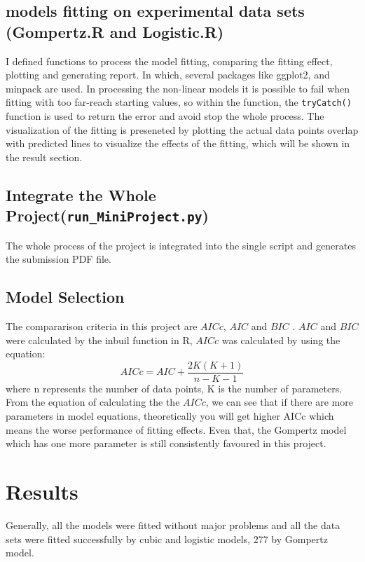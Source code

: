 \documentclass[11pt, a4paper]{article}
\begin{document}
\subsection{models fitting on experimental data sets (Gompertz.R and Logistic.R)}

I defined functions to process the model fitting, comparing the fitting effect, plotting and generating report. In which, several packages like ggplot2, and minpack are used. In processing the non-linear models it is possible to fail when fitting with too far-reach starting values, so within the function, the \verb|tryCatch()| function is used to return the error and avoid stop the whole process. The visualization of the fitting is preseneted by plotting the actual data points overlap with predicted lines to visualize the effects of the fitting, which will be shown in the result section.

\subsection{Integrate the Whole Project(\texttt{run\_MiniProject.py})}
The whole process of the project is integrated into the single script and generates the submission PDF file.

\subsection{Model Selection}
The compararison criteria in this project are  $AICc$, $AIC$ and $BIC$ \citep{anderson2004model}. $AIC$ and $BIC$ were calculated by the inbuil function in R, $AICc$ was calculated by using the equation: \begin{equation}\label{eqn:AICc}
    AICc = AIC + \frac{2K(K+1)}{n−K−1}
\end{equation} where n represents the number of data points, K is the number of parameters. From the equation of calculating the the $AICc$, we can see that if there are more parameters in model equations, theoretically you will get higher AICc which means the worse performance of fitting effects. Even that, the Gompertz model which has one more parameter is still consistently favoured in this project.


\section{Results}
Generally, all the models were fitted without major problems and all the data sets were fitted successfully by cubic and logistic models, 277 by Gompertz model. 
\end{document}
